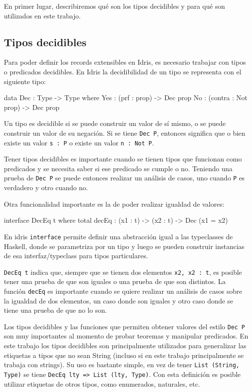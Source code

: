 En primer lugar, describiremos qué son los tipos decidibles y para qué son utilizados en este trabajo.

\subsection{Tipos decidibles}

Para poder definir los records extensibles en Idris, es necesario trabajar con tipos o predicados decidibles. En Idris la decidibilidad de un tipo se representa con el siguiente tipo:

\begin{code}
data Dec : Type -> Type where
  Yes : (prf : prop) -> Dec prop
  No : (contra : Not prop) -> Dec prop
\end{code}

Un tipo es decidible si se puede construir un valor de sí mismo, o se puede construir un valor de su negación. Si se tiene \texttt{Dec P}, entonces significa que o bien existe un valor \texttt{s : P} o existe un valor \texttt{n : Not P}.

Tener tipos decidibles es importante cuando se tienen tipos que funcionan como predicados y se necesita saber si ese predicado se cumple o no. Teniendo una prueba de \texttt{Dec P} se puede entonces realizar un análisis de casos, uno cuando \texttt{P} es verdadero y otro cuando no.

Otra funcionalidad importante es la de poder realizar igualdad de valores:

\begin{code}
interface DecEq t where
  total decEq : (x1 : t) -> (x2 : t) -> Dec (x1 = x2)
\end{code}

En idris \texttt{interface} permite definir una abstracción igual a las typeclasses de Haskell, donde se parametriza por un tipo y luego se pueden construir instancias de esa interfaz/typeclass para tipos particulares.

\texttt{DecEq t} indica que, siempre que se tienen dos elementos \texttt{x2, x2 : t}, es posible tener una prueba de que son iguales o una prueba de que son distintos. La función \texttt{decEq} es importante cuando se quiere realizar un análisis de casos sobre la igualdad de dos elementos, un caso donde son iguales y otro caso donde se tiene una prueba de que no lo son.

Los tipos decidibles y las funciones que permiten obtener valores del estilo \texttt{Dec P} son muy importantes al momento de probar teoremas y manipular predicados. En este trabajo los tipos decidibles son principalmente utilizados para generalizar las etiquetas a tipos que no sean String (incluso si en este trabajo principalmente se trabaja con strings). Su uso es bastante simple, en vez de tener \texttt{List (String, Type)} se tiene \texttt{DecEq lty => List (lty, Type)}. Con esta definición es posible utilizar etiquetas de otros tipos, como enumerados, naturales, etc.

